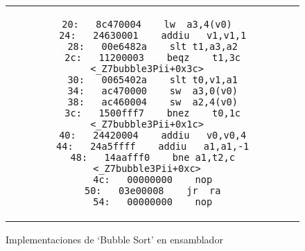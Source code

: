 \begin{figure}
\begin{center}
\begin{tabular}{c c}
\begin{minipage}[t]{.4\textwidth}
\begin{lstlisting}[language={[mips]Assembler},caption=bubble3, basicstyle=\ttfamily\tiny, tabsize=2]
  20:	8c470004 	lw	a3,4(v0)
  24:	24630001 	addiu	v1,v1,1
  28:	00e6482a 	slt	t1,a3,a2
  2c:	11200003 	beqz	t1,3c <_Z7bubble3Pii+0x3c>
  30:	0065402a 	slt	t0,v1,a1
  34:	ac470000 	sw	a3,0(v0)
  38:	ac460004 	sw	a2,4(v0)
  3c:	1500fff7 	bnez	t0,1c <_Z7bubble3Pii+0x1c>
  40:	24420004 	addiu	v0,v0,4
  44:	24a5ffff 	addiu	a1,a1,-1
  48:	14aafff0 	bne	a1,t2,c <_Z7bubble3Pii+0xc>
  4c:	00000000 	nop
  50:	03e00008 	jr	ra
  54:	00000000 	nop
		\end{lstlisting}
	\end{minipage} \\
\end{tabular}
\label{bubble}
\end{center}
\caption{Implementaciones de `Bubble Sort' en ensamblador}
\end{figure}

